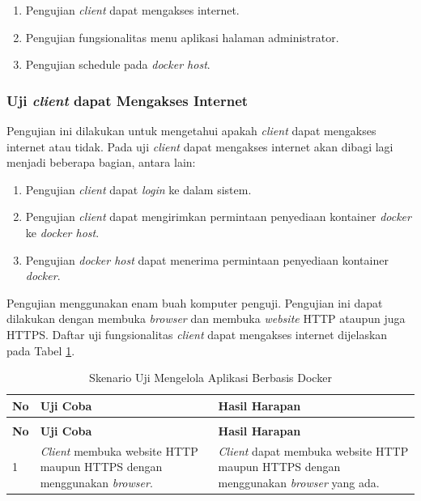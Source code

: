\begin{enumerate}
	\item Pengujian \textit{client} dapat mengakses internet.
	\item Pengujian fungsionalitas menu aplikasi halaman administrator.
	\item Pengujian schedule pada \textit{docker host}.
\end{enumerate}

\subsubsection{Uji \textit{client} dapat Mengakses Internet} \label{keempat}
Pengujian ini dilakukan untuk mengetahui apakah \textit{client} dapat mengakses internet atau tidak. Pada uji \textit{client} dapat mengakses internet akan dibagi lagi menjadi beberapa bagian, antara lain:
\begin{enumerate}
	\item Pengujian \textit{client} dapat \textit{login} ke dalam sistem.
	\item Pengujian \textit{client} dapat mengirimkan permintaan penyediaan kontainer \textit{docker} ke \textit{docker host}.
	\item Pengujian \textit{docker host} dapat menerima permintaan penyediaan kontainer \textit{docker}.
\end{enumerate}

Pengujian menggunakan enam buah komputer penguji. Pengujian ini dapat dilakukan dengan membuka \textit{browser} dan membuka \textit{website} HTTP ataupun juga HTTPS. Daftar uji fungsionalitas \textit{client} dapat mengakses internet dijelaskan pada Tabel \ref{ujicoba4}.
\begin{longtable}{|p{}|p{}|p{}|}					\caption{Skenario Uji \textit{Client} dapat Mengakses Internet} \label{ujicoba4} \\
	\hline
	\textbf{No} & \textbf{Uji Coba} & \textbf{Hasil Harapan} \\ \hline
	\endfirsthead
	\caption[]{Skenario Uji Mengelola Aplikasi Berbasis Docker} \\
	\hline
	\textbf{No} & \textbf{Uji Coba} & \textbf{Hasil Harapan} \\ \hline
	\endhead
	\endfoot
	\endlastfoot
	
	1 & \textit{Client} membuka website HTTP maupun HTTPS dengan menggunakan \textit{browser}. & \textit{Client} dapat membuka website HTTP maupun HTTPS dengan menggunakan \textit{browser} yang ada.\\ \hline
\end{longtable}

